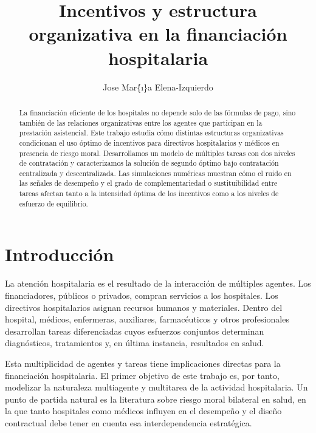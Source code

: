 ﻿\documentclass[12pt,letterpaper]{article}
\title{\textbf{Incentivos y estructura organizativa en la financiaci\'on hospitalaria}}
\author{Jose Mar\'\{\i\}a Elena-Izquierdo}
\date{}
\begin{document}
\maketitle

\begin{abstract}
La financiaci\'on eficiente de los hospitales no depende solo de las f\'ormulas de pago, sino tambi\'en de las relaciones organizativas entre los agentes que participan en la prestaci\'on asistencial. Este trabajo estudia c\'omo distintas estructuras organizativas condicionan el uso \'optimo de incentivos para directivos hospitalarios y m\'edicos en presencia de riesgo moral. Desarrollamos un modelo de m\'ultiples tareas con dos niveles de contrataci\'on y caracterizamos la soluci\'on de segundo \'optimo bajo contrataci\'on centralizada y descentralizada. Las simulaciones num\'ericas muestran c\'omo el ruido en las se\~nales de desempe\~no y el grado de complementariedad o sustituibilidad entre tareas afectan tanto a la intensidad \'optima de los incentivos como a los niveles de esfuerzo de equilibrio.
\end{abstract}

\section*{Introducci\'on}
La atenci\'on hospitalaria es el resultado de la interacci\'on de m\'ultiples agentes. Los financiadores, p\'ublicos o privados, compran servicios a los hospitales. Los directivos hospitalarios asignan recursos humanos y materiales. Dentro del hospital, m\'edicos, enfermeras, auxiliares, farmac\'euticos y otros profesionales desarrollan tareas diferenciadas cuyos esfuerzos conjuntos determinan diagn\'osticos, tratamientos y, en \'ultima instancia, resultados en salud.

Esta multiplicidad de agentes y tareas tiene implicaciones directas para la financiaci\'on hospitalaria. El primer objetivo de este trabajo es, por tanto, modelizar la naturaleza multiagente y multitarea de la actividad hospitalaria. Un punto de partida natural es la literatura sobre riesgo moral bilateral en salud, en la que tanto hospitales como m\'edicos influyen en el desempe\~no y el dise\~no contractual debe tener en cuenta esa interdependencia estrat\'egica.
\end{document}
